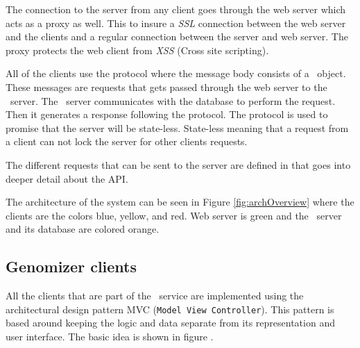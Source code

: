 The connection to the server from any client goes through the web server which acts as a proxy as well. This to insure a \textit{SSL} connection between the web server and the clients and a regular connection between the server and web server. The proxy protects the web client from \textit{XSS} (Cross site scripting). 

All of the clients use the  protocol where the message body consists of a \json\ object.
These messages are requests that gets passed through the web server to the \appName\ server. The \appName\ server communicates with the database to perform the request. Then it generates a response following the  protocol. The  protocol is used to promise that the server will be state-less. State-less meaning that a request from a client can not lock the server for other clients requests. 

The different requests that can be sent to the server are defined in  that goes into deeper detail about the API.

The architecture of the system can be seen in Figure \ref{fig:archOverview} where the clients are the colors blue, yellow, and red. Web server is green and the \appName\ server and its database are colored orange.

\subsection{Genomizer clients}

All the clients that are part of the \appName\ service are implemented using the architectural design pattern MVC (\texttt{Model View Controller}). This pattern is based around keeping the logic and data separate from its representation and user interface. The basic idea is shown in figure .

